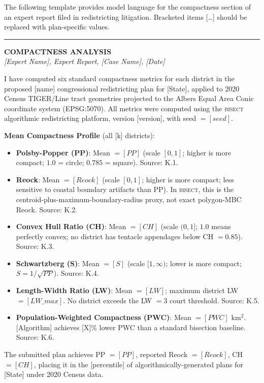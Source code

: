 The following template provides model language for the compactness section of
an expert report filed in redistricting litigation.
Bracketed items [\ldots] should be replaced with plan-specific values.

\bigskip
\hrule
\bigskip

\noindent\textbf{COMPACTNESS ANALYSIS} \\
\textit{[Expert Name], Expert Report, [Case Name], [Date]}

\bigskip

\noindent I have computed six standard compactness metrics for each district in
the proposed [name] congressional redistricting plan for [State], applied to
2020 Census TIGER/Line tract geometries projected to the Albers Equal Area
Conic coordinate system (EPSG:5070).
All metrics were computed using the \textsc{bisect} algorithmic redistricting
platform, version [version], with seed $= [seed]$.

\bigskip

\noindent\textbf{Mean Compactness Profile} (all [k] districts):
\begin{itemize}
  \item \textbf{Polsby-Popper (PP)}: Mean $= [PP]$ (scale $[0,1]$; higher is more compact;
    $1.0$ = circle; $0.785$ = square). Source: K.1.
  \item \textbf{Reock}: Mean $= [Reock]$ (scale $[0,1]$; higher is more compact;
    less sensitive to coastal boundary artifacts than PP). In \textsc{bisect},
    this is the centroid-plus-maximum-boundary-radius proxy, not exact polygon-MBC
    Reock. Source: K.2.
  \item \textbf{Convex Hull Ratio (CH)}: Mean $= [CH]$ (scale $(0,1]$; $1.0$
    means perfectly convex; no district has tentacle appendages below CH $= 0.85$).
    Source: K.3.
  \item \textbf{Schwartzberg (S)}: Mean $= [S]$ (scale $[1,\infty)$; lower is
    more compact; $S = 1/\sqrt{PP}$). Source: K.4.
  \item \textbf{Length-Width Ratio (LW)}: Mean $= [LW]$; maximum district LW $= [LW\_max]$.
    No district exceeds the LW $= 3$ court threshold. Source: K.5.
  \item \textbf{Population-Weighted Compactness (PWC)}: Mean $= [PWC]$ km$^2$.
    [Algorithm] achieves [X]\% lower PWC than a standard bisection baseline.
    Source: K.6.
\end{itemize}

\noindent The submitted plan achieves PP $= [PP]$, reported Reock $= [Reock]$,
CH $= [CH]$, placing it in the [percentile] of algorithmically-generated plans
for [State] under 2020 Census data.

